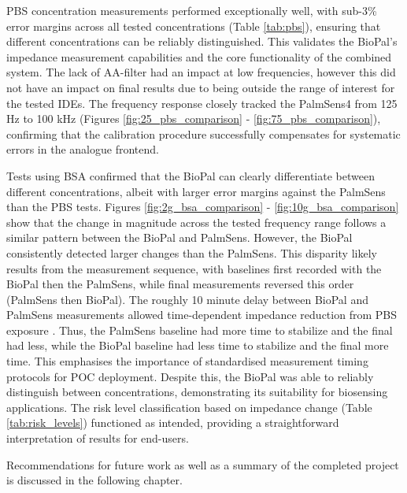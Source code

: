 PBS concentration measurements performed exceptionally well, with sub-3\% error margins across all tested concentrations (Table \ref{tab:pbs}), ensuring that different concentrations can be reliably distinguished. This validates the BioPal's impedance measurement capabilities and the core functionality of the combined system.  The lack of AA-filter had an impact at low frequencies, however this did not have an impact on final results due to being outside the range of interest for the tested \acp{IDE}. The frequency response closely tracked the PalmSens4 from 125 Hz to 100 kHz (Figures \ref{fig:25_pbs_comparison} - \ref{fig:75_pbs_comparison}), confirming that the calibration procedure successfully compensates for systematic errors in the analogue frontend.

Tests using BSA confirmed that the BioPal can clearly differentiate between different concentrations, albeit with larger error margins against the PalmSens than the PBS tests. Figures \ref{fig:2g_bsa_comparison} - \ref{fig:10g_bsa_comparison} show that the change in magnitude across the tested frequency range follows a similar pattern between the BioPal and PalmSens. However, the BioPal consistently detected larger changes than the PalmSens. This disparity likely results from the measurement sequence, with baselines first recorded with the BioPal then the PalmSens, while final measurements reversed this order (PalmSens then BioPal). The roughly 10 minute delay between BioPal and PalmSens measurements allowed time-dependent impedance reduction from PBS exposure \cite{moultonStudiesDoubleLayer2004}. Thus, the PalmSens baseline had more time to stabilize and the final had less, while the BioPal baseline had less time to stabilize and the final more time. This emphasises the importance of standardised measurement timing protocols for \ac{POC} deployment. Despite this, the BioPal was able to reliably distinguish between concentrations, demonstrating its suitability for biosensing applications. The risk level classification based on impedance change (Table \ref{tab:risk_levels}) functioned as intended, providing a straightforward interpretation of results for end-users.

Recommendations for future work as well as a summary of the completed project is discussed in the following chapter.

\label{chap:testing_and_validation}